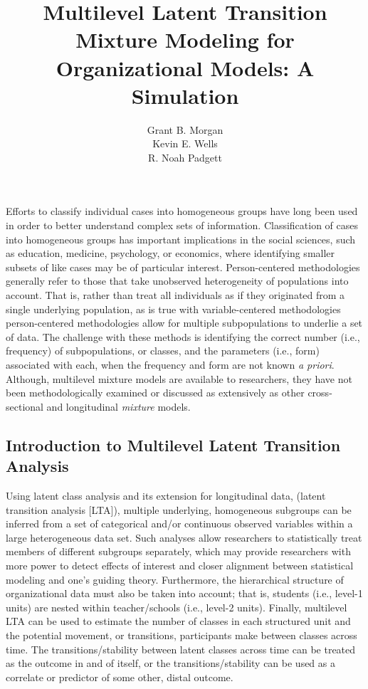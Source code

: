 \documentclass[man]{apa6}
\title{Multilevel Latent Transition Mixture Modeling for Organizational Models: A Simulation}
\author{Grant B. Morgan \\ Kevin E. Wells \\ R. Noah Padgett}
\affiliation{Baylor University}
\begin{document}
\maketitle



Efforts to classify individual cases into homogeneous groups have long been used in order to better understand complex sets of information. Classification of cases into homogeneous groups has important implications in the social sciences, such as education, medicine, psychology, or economics, where identifying smaller subsets of like cases may be of particular interest.  Person-centered methodologies generally refer to those that take unobserved heterogeneity of populations into account. That is, rather than treat all individuals as if they originated from a single underlying population, as is true with variable-centered methodologies  person-centered methodologies allow for multiple subpopulations to underlie a set of data. The challenge with these methods is identifying the correct number (i.e., frequency) of subpopulations, or classes, and the parameters (i.e., form) associated with each, when the frequency and form are not known \textit{a priori}. Although, multilevel mixture models are available to researchers, they have not been methodologically examined or discussed as extensively as other cross-sectional and longitudinal \textit{mixture} models. 

\subsection*{Introduction to Multilevel Latent Transition Analysis}
Using latent class analysis and its extension for longitudinal data, (latent transition analysis [LTA]), multiple underlying, homogeneous subgroups can be inferred from a set of categorical and/or continuous observed variables within a large heterogeneous data set. Such analyses allow researchers to statistically treat members of different subgroups separately, which may provide researchers with more power to detect effects of interest and closer alignment between statistical modeling and one's guiding theory. Furthermore, the hierarchical structure of organizational data must also be taken into account; that is, students (i.e., level-1 units) are nested within teacher/schools (i.e., level-2 units). Finally, multilevel LTA can be used to estimate the number of classes in each structured unit and the potential movement, or transitions, participants make between classes across time. The transitions/stability between latent classes across time can be treated as the outcome in and of itself, or the transitions/stability can be used as a correlate or predictor of some other, distal outcome.
\end{document}
